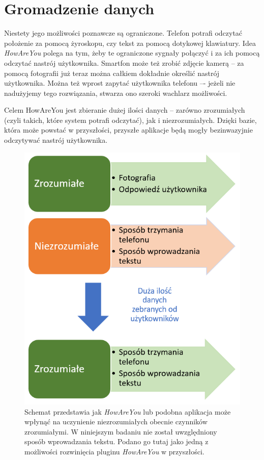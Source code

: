\section{Gromadzenie danych}
\label{sec:gromadzenieDanych}

Niestety jego możliwości poznawcze są ograniczone. Telefon potrafi odczytać położenie za pomocą żyroskopu, czy tekst za pomocą dotykowej klawiatury. Idea \textit{HowAreYou} polega na tym, żeby te ograniczone sygnały połączyć i za ich pomocą odczytać nastrój użytkownika. Smartfon może też zrobić zdjęcie kamerą -- za pomocą fotografii już teraz można całkiem dokładnie określić nastrój użytkownika. Można też wprost zapytać użytkownika telefonu –- jeżeli nie nadużyjemy tego rozwiązania, stwarza ono szeroki wachlarz możliwości.

Celem HowAreYou jest zbieranie dużej ilości danych -- zarówno zrozumiałych (czyli takich, które system potrafi odczytać), jak i niezrozumiałych. Dzięki bazie, która może powstać w przyszłości, przyszłe aplikacje będą mogły bezinwazyjnie odczytywać nastrój użytkownika.

\begin{figure}[H]
	\centering
	\includegraphics[scale=0.7]{rozdzial1/gromadzenieDanych.png}
	\caption{Schemat przedstawia jak \textit{HowAreYou} lub podobna aplikacja może wpłynąć na uczynienie niezrozumiałych obecnie czynników zrozumiałymi. W niniejszym badaniu nie został uwzględniony sposób wprowadzania tekstu. Podano go tutaj jako jedną z możliwości rozwinięcia pluginu \textit{HowAreYou} w przyszłości.}
\end{figure}


